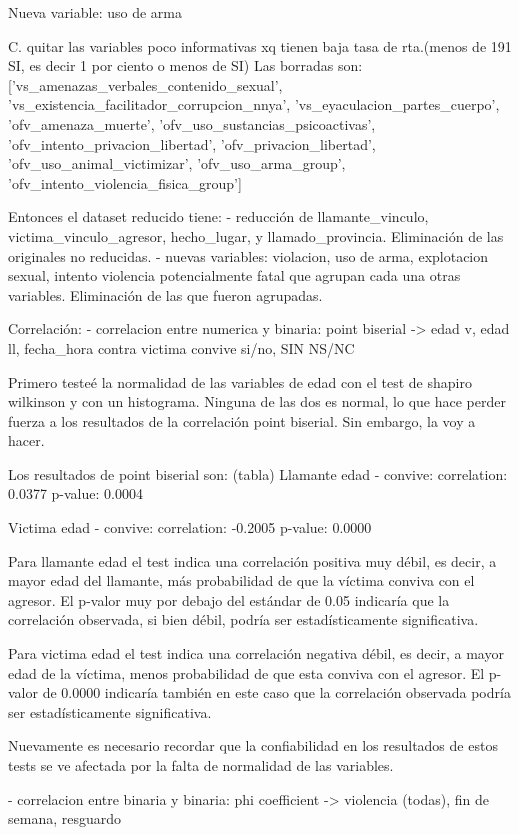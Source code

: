 \documentclass[10pt, spanish]{article}
\begin{document}
Nueva variable: uso de arma


C. quitar las variables poco informativas xq tienen baja tasa de rta.(menos de 191 SI, es decir 1 por ciento o menos de SI)
Las borradas son: ['vs_amenazas_verbales_contenido_sexual', 'vs_existencia_facilitador_corrupcion_nnya', 'vs_eyaculacion_partes_cuerpo', 'ofv_amenaza_muerte', 'ofv_uso_sustancias_psicoactivas', 'ofv_intento_privacion_libertad', 'ofv_privacion_libertad', 'ofv_uso_animal_victimizar', 'ofv_uso_arma_group', 'ofv_intento_violencia_fisica_group']

Entonces el dataset reducido tiene: 
- reducción de llamante_vinculo, victima_vinculo_agresor, hecho_lugar, y llamado_provincia. Eliminación de las originales no reducidas.
- nuevas variables: violacion, uso de arma, explotacion sexual, intento violencia potencialmente fatal que agrupan cada una otras variables. Eliminación de las que fueron agrupadas.



Correlación:
- correlacion entre numerica y binaria: point biserial -> edad v, edad ll, fecha_hora contra victima convive si/no, SIN NS/NC

Primero testeé la normalidad de las variables de edad con el test de shapiro wilkinson y con un histograma. Ninguna de las dos es normal, lo que hace perder fuerza a los resultados de la correlación point biserial. Sin embargo, la voy a hacer.

Los resultados de point biserial son: (tabla)
Llamante edad - convive:
correlation: 0.0377
p-value: 0.0004


Victima edad - convive:
correlation: -0.2005
p-value:  0.0000

Para llamante edad el test indica una correlación positiva muy débil, es decir, a mayor edad del llamante, más probabilidad de que la víctima conviva con el agresor. El p-valor muy por debajo del estándar de 0.05 indicaría que la correlación observada, si bien débil, podría ser estadísticamente significativa. 

Para victima edad el test indica una correlación negativa débil, es decir, a mayor edad de la víctima, menos probabilidad de que esta conviva con el agresor. El p-valor de 0.0000 indicaría también en este caso que la correlación observada podría ser estadísticamente significativa. 

Nuevamente es necesario recordar que la confiabilidad en los resultados de estos tests se ve afectada por la falta de normalidad de las variables.


- correlacion entre binaria y binaria: phi coefficient -> violencia (todas), fin de semana,  resguardo
\end{document}
